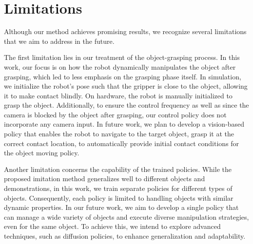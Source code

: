\section{Limitations}
Although our method achieves promising results, we recognize several limitations that we aim to address in the future.

The first limitation lies in our treatment of the object-grasping process. In this work, our focus is on how the robot dynamically manipulates the object after grasping, which led to less emphasis on the grasping phase itself. In simulation, we initialize the robot's pose such that the gripper is close to the object, allowing it to make contact blindly. On hardware, the robot is manually initialized to grasp the object. Additionally, to ensure the control frequency as well as since the camera is blocked by the object after grasping, our control policy does not incorporate any camera input. In future work, we plan to develop a vision-based policy that enables the robot to navigate to the target object, grasp it at the correct contact location, to automatically provide initial contact conditions for the object moving policy.

Another limitation concerns the capability of the trained policies. While the proposed imitation method generalizes well to different objects and demonstrations, in this work, we train separate policies for different types of objects. Consequently, each policy is limited to handling objects with similar dynamic properties. In our future work, we aim to develop a single policy that can manage a wide variety of objects and execute diverse manipulation strategies, even for the same object. To achieve this, we intend to explore advanced techniques, such as diffusion policies, to enhance generalization and adaptability.




